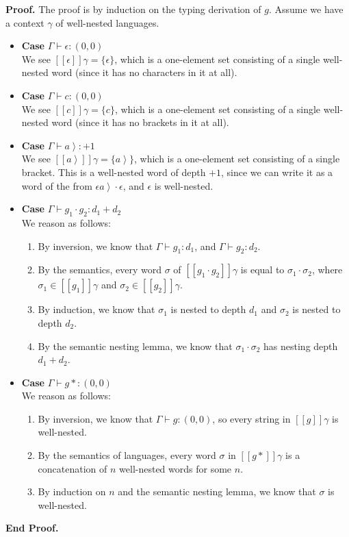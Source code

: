 \documentclass{article}
\newcommand{\rgt}[1]{\left.{#1}\right>}
\newcommand{\judgebalance}[3][\Gamma]{{#1} \vdash {#2} : {#3}}
\newcommand{\zero}{(0,0)}
\newcommand{\interp}[1]{[\![{#1}]\!]}
\newcommand{\setof}[1]{\{{#1}\}}
\newenvironment{proof}{\noindent\textbf{Proof.}}{\noindent\textbf{End Proof.}}
\newenvironment{caseblock}{\begin{itemize}}{\end{itemize}}
\newenvironment{case}[1]{\item \textbf{Case} {#1}\\}{}
\begin{document}
\begin{proof}
The proof is by induction on the typing derivation of $g$. Assume we have a context $\gamma$ of well-nested
languages.

\begin{caseblock}
  \begin{case}{$\judgebalance{\epsilon}{\zero}$}
    We see $\interp{\epsilon}{\gamma} = \setof{\epsilon}$, which is a one-element set consisting 
    of a single well-nested word (since it has no characters in it at all). 
  \end{case}

  \begin{case}{$\judgebalance{c}{\zero}$}
    We see $\interp{c}{\gamma} = \setof{c}$, which is a one-element set consisting 
    of a single well-nested word (since it has no brackets in it at all). 
  \end{case}

  \begin{case}{$\judgebalance{\rgt{a}}{+1}$}
    We see $\interp{\rgt{a}}{\gamma} = \setof{\rgt{a}}$, which is a one-element set consisting 
    of a single bracket. This is a well-nested word of depth $+1$, since we can write it as a 
    word of the from $\epsilon\rgt{a}\cdot\epsilon$, and $\epsilon$ is well-nested. 
   \end{case}

  \begin{case}{$\judgebalance{g_1\cdot g_2}{d_1 + d_2}$}
    We reason as follows: 
    \begin{enumerate}
      \item By inversion, we know that $\judgebalance{g_1}{d_1}$, and $\judgebalance{g_2}{d_2}$.
      \item By the semantics, every word $\sigma$ of $\interp{g_1\cdot g_2}\gamma$ is equal to 
        $\sigma_1\cdot\sigma_2$, where $\sigma_1 \in \interp{g_1}\gamma$ and $\sigma_2 \in \interp{g_2}\gamma$. 
      \item By induction, we know that $\sigma_1$ is nested to depth $d_1$ and $\sigma_2$ is nested to depth $d_2$.
      \item By the semantic nesting lemma, we know that $\sigma_1 \cdot \sigma_2$ has nesting depth $d_1 + d_2$. 
    \end{enumerate}
  \end{case}

  \begin{case}{$\judgebalance{g*}{\zero}$}
    We reason as follows: 
    \begin{enumerate}
      \item By inversion, we know that $\judgebalance{g}{\zero}$, so every string in $\interp{g}\gamma$ is 
        well-nested. 
      \item By the semantics of languages, every word $\sigma$ in $\interp{g*}\gamma$ is a concatenation of 
        $n$ well-nested words for some $n$. 
      \item By induction on $n$ and the semantic nesting lemma, we know that $\sigma$ is well-nested. 
    \end{enumerate}
  \end{case}


\end{caseblock}
\end{proof}
\end{document}
